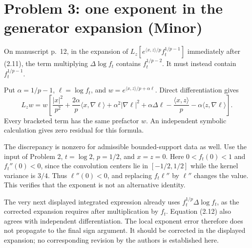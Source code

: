 \documentclass[10pt]{article}
\begin{document}
\section*{Problem 3: one exponent in the generator expansion (Minor)}
On manuscript p. 12, in the expansion of \(L_z[e^{\langle x,z\rangle/p}f_t^{1/p-1}]\) immediately after (2.11), the term multiplying \(\Delta\log f_t\) contains \(f_t^{1/p-2}\). It must instead contain \(f_t^{1/p-1}\).\par
Put \(\alpha=1/p-1\), \(\ell=\log f_t\), and \(w=e^{\langle x,z\rangle/p+\alpha\ell}\). Direct differentiation gives \[L_zw=w\left[
 \frac{|x|^2}{p^2}+\frac{2\alpha}{p}\langle x,\nabla\ell\rangle
 +\alpha^2|\nabla\ell|^2+\alpha\Delta\ell
 -\frac{\langle x,z\rangle}{p}
 -\alpha\langle z,\nabla\ell\rangle\right].\] Every bracketed term has the same prefactor \(w\). An independent symbolic calculation gives zero residual for this formula.\par
The discrepancy is nonzero for admissible bounded-support data as well. Use the input of Problem 2, \(t=\log2\), \(p=1/2\), and \(x=z=0\). Here \(0<f_t(0)<1\) and \(f_t''(0)<0\), since the convolution centers lie in \([-1/2,1/2]\) while the kernel variance is \(3/4\). Thus \(\ell''(0)<0\), and replacing \(f_t\ell''\) by \(\ell''\) changes the value. This verifies that the exponent is not an alternative identity.\par
The very next displayed integrated expression already uses \(f_t^{1/p}\Delta\log f_t\), as the corrected expansion requires after multiplication by \(f_t\). Equation (2.12) also agrees with independent differentiation. The local exponent error therefore does not propagate to the final sign argument. It should be corrected in the displayed expansion; no corresponding revision by the authors is established here.\par
\end{document}
